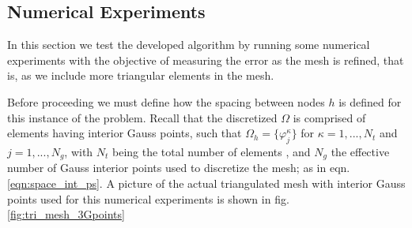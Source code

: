\documentclass{uonmathreport}
\begin{document}
\subsection{Numerical Experiments} \label{subsec:tri_num_experiments}
In this section we test the developed algorithm by running some numerical experiments with the objective of measuring the error as the mesh is refined, that is, as we include more triangular elements in the mesh. 

Before proceeding we must define how the spacing between nodes $h$ is defined for this instance of the problem. Recall that the discretized $\Omega$ is comprised of elements having interior Gauss points, such that $\Omega_h=\{\varphi_j^{\kappa}\}$ for $\kappa = 1,...,N_t$ and $j = 1,...,N_g$, with $N_t$ being the total number of elements , and $N_g$ the effective number of Gauss interior points used to discretize the mesh; as in eqn. \ref{eqn:space_int_ps}. A picture of the actual triangulated mesh with interior Gauss points used for this numerical experiments is shown in fig. \ref{fig:tri_mesh_3Gpoints}
\end{document}
